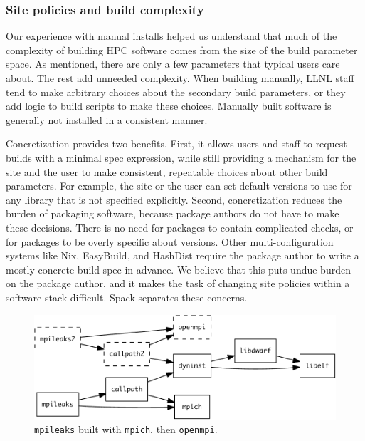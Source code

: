\subsubsection{Site policies and build complexity}

Our experience with manual installs helped us understand that much of the complexity
of building HPC software comes from the size of the build parameter space.
As mentioned, there are only a few parameters that typical users care about.
The rest add unneeded complexity.  When building manually, LLNL staff
tend to make arbitrary choices about the secondary build parameters,
or they add logic to build scripts to make these choices.
Manually built software is generally not installed in a consistent manner.

Concretization provides two benefits.  First, it allows users and staff to
request builds with a minimal spec expression, while still providing a
mechanism for the site and the user to make consistent, repeatable choices about
other build parameters.  For example, the site or the user can set default versions
to use for any library that is not specified explicitly.
%
Second, concretization reduces the burden of packaging software, because
package authors do not have to make these decisions.  There is no
need for packages to contain complicated checks, or for packages to be overly
specific about versions.  Other multi-configuration systems like Nix, EasyBuild,
and HashDist require the package author to write a mostly concrete build spec in advance.
We believe that this puts undue burden on the package author, and it makes the task
of changing site policies within a software stack difficult.  Spack
separates these concerns.

\begin{figure}\centering
   \includegraphics[width=.9\linewidth]{specs/rpaths.pdf}
   \caption{
       {\tt mpileaks} built with {\tt mpich}, then {\tt openmpi}.
       \label{fig:reuse}
   }
\end{figure}
